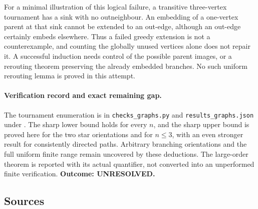 \documentclass[11pt,a4paper]{article}
\begin{document}
For a minimal illustration of this logical failure, a transitive
three-vertex tournament has a sink with no outneighbour. An embedding
of a one-vertex parent at that sink cannot be extended to an out-edge,
although an out-edge certainly embeds elsewhere. Thus a failed greedy
extension is not a counterexample, and counting the globally unused
vertices alone does not repair it. A successful induction needs control
of the possible parent images, or a rerouting theorem preserving the
already embedded branches. No such uniform rerouting lemma is proved
in this attempt.

\paragraph{Verification record and exact remaining gap.}
The tournament enumeration is in \texttt{checks\_graphs.py} and
\texttt{results\_graphs.json} under
.
The sharp lower bound holds for every $n$, and the sharp upper bound
is proved here for the two star orientations and for $n\le3$, with
an even stronger result for consistently directed paths. Arbitrary
branching orientations and the full uniform finite range remain
uncovered by these deductions. The large-order theorem is reported
with its actual quantifier, not converted into an unperformed finite
verification. \textbf{Outcome: UNRESOLVED.}

\subsection{Sources}
\end{document}
